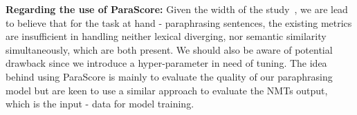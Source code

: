 \documentclass[fleqn,moreauthors,10pt]{ds_report}
\begin{document}
 \textbf{Regarding the use of ParaScore:} Given the width of the study~\cite{evaluation-metrics-in-paraphrase-generation}, we are lead to believe that for the task at hand - paraphrasing sentences, the existing metrics are insufficient in handling neither lexical diverging, nor semantic similarity simultaneously, which are both present. We should also be aware of potential drawback since we introduce a hyper-parameter in need of tuning. The idea behind using ParaScore is mainly to evaluate the quality of our paraphrasing model but are keen to use a similar approach to evaluate the NMTs output, which is the input - data for model training.

\end{document}
